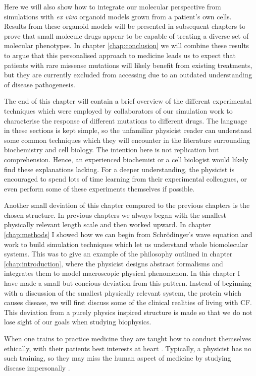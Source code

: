 Here we will also show how to integrate our molecular perspective from simulations with \textit {ex vivo} organoid models grown from a patient's own cells. Results from these organoid models will be presented in subsequent chapters to prove that small molecule drugs appear to be capable of treating a diverse set of molecular phenotypes. In chapter \ref{chap:conclusion} we will combine these results to argue that this personalised approach to medicine leads us to expect that patients with rare missense mutations will likely benefit from existing treatments, but they are currently excluded from accessing due to an outdated understanding of disease pathogenesis. 

The end of this chapter will contain a brief overview of the different experimental techniques which were employed by collaborators of our simulation work to characterise the response of different mutations to different drugs. The language in these sections is kept simple, so the unfamiliar physicist reader can understand some common techniques which they will encounter in the literature surrounding biochemistry and cell biology. The intention here is not replication but comprehension. Hence, an experienced biochemist or a cell biologist would likely find these explanations lacking. For a deeper understanding, the physicist is encouraged to spend lots of time learning from their experimental colleagues, or even perform some of these experiments themselves if possible. 

Another small deviation of this chapter compared to the previous chapters is the chosen structure. In previous chapters we always began with the smallest physically relevant length scale and then worked upward. In chapter \ref{chap:methods} I showed how we can begin from Schr\"odinger's wave equation and work to build simulation techniques which let us understand whole biomolecular systems. This was to give an example of the philosophy outlined in chapter \ref{chap:introduction}, where the physicist designs abstract formalisms and integrates them to model macroscopic physical phenomenon. In this chapter I have made a small but concious deviation from this pattern. Instead of beginning with a discussion of the smallest physically relevant system, the protein which causes disease, we will first discuss some of the clinical realities of living with CF. This deviation from a purely physics inspired structure is made so that we do not lose sight of our goals when studying biophysics.

When one trains to practice medicine they are taught how to conduct themselves ethically, with their patients best interests at heart \cite{hajar2017}. Typically, a physicist has no such training, so they may miss the human aspect of medicine by studying disease impersonally \cite{foucault1994}. 

